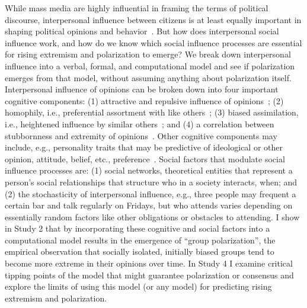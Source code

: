 \documentclass[12pt,letterpaper]{article}
\begin{document}
While mass media are highly influential in framing the terms of political
discourse, interpersonal influence between citizens is at least equally important in
shaping political opinions and behavior~\cite{Katz1955}. But how does 
interpersonal social influence work, and how do we know which social 
influence processes are essential for rising extremism and polarization to
emerge? We break down interpersonal influence into a verbal, formal, and computational
model and see if polarization emerges from that model, without assuming anything
about polarization itself. Interpersonal influence of opinions can be broken down into
four important cognitive components: (1) attractive and repulsive influence of
opinions~\cite{French1956,Cikara2014,Bail2018}; (2) homophily, i.e., preferential assortment with like others~\cite{McPherson2001};
(3) biased assimilation, i.e., heightened influence by similar others~\cite{Dandekar2013}; and
(4) a correlation between stubbornness and extremity of opinions~\cite{Reiss2019,Zmigrod2019a}. 
Other cognitive components may include, e.g., personality traits that may be predictive of 
ideological or other opinion, attitude, belief, etc., preference~\cite{Zmigrod2018}.
Social factors that modulate social influence processes are: (1) social
networks, theoretical entities that represent a person's social relationships
that structure who in a society interacts, when; and (2) the stochasticity
of interpersonal influence, e.g., three people may frequent a certain bar
and talk regularly on Fridays, but who attends varies depending on essentially
random factors like other obligations or obstacles to attending. I show in
Study 2 that by incorporating these cognitive and social factors into a computational
model results in the emergence of ``group polarization'', the empirical 
observation that socially isolated, initially biased groups tend to become
more extreme in their opinions over time. In Study 4 I examine critical
tipping points of the model that might guarantee polarization or consensus and
explore the limits of using this model (or any model) for predicting 
rising extremism and polarization.
\end{document}
